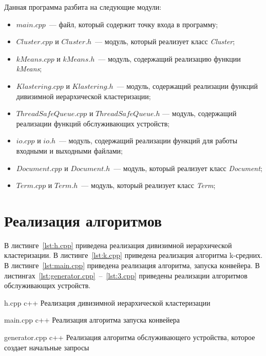 Данная программа разбита на следующие модули:
\begin{itemize}
	\item $main.cpp$~--- файл, который содержит точку входа в программу;
	\item $Cluster.cpp$ и $Cluster.h$~--- модуль, который реализует класс \textit{Cluster};
	\item $kMeans.cpp$ и $kMeans.h$~--- модуль, содержащий реализацию функции \textit{kMeans};
	\item $Klastering.cpp$ и $Klastering.h$~--- модуль, содержащий реализации функций дивизимной иерархической кластеризации;
	\item $ThreadSafeQueue.cpp$ и $ThreadSafeQueue.h$ --- модуль, содержащий реализации функций обслуживающих устройств;
	\item $io.cpp$ и $io.h$~--- модуль, содержащий реализации функций для работы входными и выходными файлами;
	\item $Document.cpp$ и $Document.h$~--- модуль, который реализует класс \textit{Document};
	\item $Term.cpp$ и $Term.h$~--- модуль, который реализует класс \textit{Term};
\end{itemize}

\section{Реализация алгоритмов}

В листинге~\ref{lst:h.cpp} приведена реализация дивизимной иерархической кластеризации.
В листинге~\ref{lst:k.cpp} приведена реализация алгоритма k-средних.
В листинге~\ref{lst:main.cpp} приведена реализация алгоритма, запуска конвейера.
В листингах~\ref{lst:generator.cpp}~--~\ref{lst:3.cpp} приведены реализации алгоритмов обслуживающих устройств.


{h.cpp} %
{c++} %
{Реализация дивизимной иерархической кластеризации} %

\clearpage


{main.cpp} %
{c++} %
{Реализация алгоритма запуска конвейера} %


{generator.cpp} %
{c++} %
{Реализация алгоритма обслуживающего устройства, которое создает начальные запросы} %


